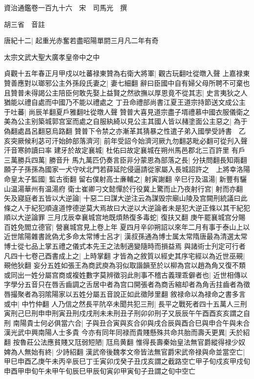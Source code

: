 資治通鑑卷一百九十六　宋　司馬光　撰

胡三省　音註

唐紀十二|{
	起重光赤奮若盡昭陽單閼三月凡二年有奇}


太宗文武大聖大廣孝皇帝中之中

貞觀十五年春正月甲戍以吐蕃禄東贊為右衛大將軍|{
	觀古玩翻吐從暾入聲}
上嘉禄東贊善應對以瑯邪公主外孫段氏妻之|{
	妻七細翻}
辭曰臣國中自有婦父母所聘不可棄也且贊普未得謁公主陪臣何敢先娶上益賢之然欲撫以厚恩竟不從其志|{
	史言夷狄之人猶能以禮自處而中國乃不能以禮處之}
丁丑命禮部尚書江夏王道宗持節送文成公主于吐蕃|{
	尚辰羊翻夏戶雅翻吐從暾人聲}
贊普大喜見道宗盡子壻禮慕中國衣服儀衛之美為公主别築城郭宫室而處之自服紈綺以見公主其國人皆以赭塗面公主惡之|{
	為于偽翻處昌呂翻惡烏路翻}
贊普下令禁之亦漸革其猜暴之性遣子弟入國學受詩書　乙亥突厥候利苾可汗始帥部落濟河|{
	前年受詔今始濟河厥九勿翻苾毗必翻可從刋入聲汗音寒帥讀曰率}
建牙於故定襄城|{
	杜佑曰故定襄城在朔州馬邑郡北三百許里}
有戶三萬勝兵四萬|{
	勝音升}
馬九萬匹仍奏言臣非分蒙恩為部落之長|{
	分扶問翻長知兩翻}
願子子孫孫為國家一犬守吠北門若薛延陀侵逼請從家屬入長城詔許之　上將幸洛陽命皇太子監國|{
	監古銜翻}
留右僕射高士亷輔之|{
	射寅謝翻}
辛巳行及温湯|{
	新豐有驪山温湯華州有温湯府}
衛士崔卿刁文懿憚於行役冀上驚而止乃夜射行宫|{
	射而亦翻}
矢及寢庭者五皆以大逆論|{
	十惡二曰謀大逆注云為謀毁宗廟山陵及宫闕刑統議曰此條之人于紀犯順違道悖德逆莫大焉故曰大逆以大逆論者未是犯大逆正條以其干紀犯順以大逆論罪}
三月戊辰幸襄城宫地既煩熱復多毒蛇|{
	復扶又翻}
庚午罷襄城宫分賜百姓免閻立德官|{
	營襄城宫見上卷上年}
夏四月辛卯朔詔以來年二月有事于泰山上以近世隂陽雜書訛偽尤多命太常博士呂才|{
	漢叔孫通為博士属太常隋唐最為清選太常博士從七品上掌五禮之儀式本先王之法制適變隨時而損益焉}
與諸術士刋定可行者凡四十七卷己酉書成上之|{
	上時掌翻}
才皆為之敘質以經史其序宅經以為近世巫覡|{
	覡他狄翻}
妄分五姓如張王為商武庾為羽似取諧韻至於以柳為宫以趙為角又復不類或同出一姓分屬宫商或複姓數字莫辨徵羽此則事不稽古義理乖僻者也|{
	近世相傳以字學分五音只在唇舌齒調之舌居中者為宫口開張者為商舌縮却者為角舌拄齒者為徵唇撮聚者為羽隂陽家以五姓分屬五音說正如此徵陟里翻}
敘禄命以為禄命之書多言或中|{
	中竹仲翻}
人乃信之然長平阬卒未聞共犯三刑|{
	長平之戰死者四十五萬人三刑寅刑己巳刑申申刑寅丑刑戍戌刑未未刑丑子刑卯卯刑子又辰辰午午酉酉亥亥謂之自刑}
南陽貴士何必俱當六合|{
	子與丑合寅與亥合卯與戌合辰與酉合巳與申合午與未合漢光武中興南陽人士多貴}
今亦有同年同禄而貴賤懸殊共命共胎而壽夭更異|{
	夭於紹翻}
按魯莊公法應貧賤又尫弱短陋|{
	尫烏黄翻}
惟得長壽秦始皇法無官爵縱得禄少奴婢為人無始有終|{
	少詩紹翻}
漢武帝後魏孝文帝皆法無官爵宋武帝禄與命並當空亡|{
	甲巳申酉乙庚午未丙辛辰巳丁壬寅卯戊癸子丑戊亥謂之截路空亡甲子旬戍亥甲戍旬申酉甲申旬午未甲午旬辰巳甲辰旬寅卯甲寅旬子丑謂之旬中空亡}

